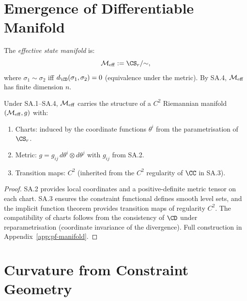 \section{Emergence of Differentiable Manifold}
\label{sec:ch14:manifold}

\begin{definition}\label{def:14.3}
The \emph{effective state manifold} is:
\begin{equation}\label{eq:eff-manifold}
  \CM_{\mathrm{eff}} := \CS_r / {\sim},
\end{equation}
where $\sigma_1 \sim \sigma_2$ iff $d_{\CD}(\sigma_1, \sigma_2) = 0$
(equivalence under the metric).
By SA.4, $\mathcal{M}_{\mathrm{eff}}$ has finite dimension $n$.
\end{definition}

\begin{theorem}\label{thm:14.3}
Under SA.1--SA.4, $\mathcal{M}_{\mathrm{eff}}$ carries the structure of a
$C^2$ Riemannian manifold $(\mathcal{M}_{\mathrm{eff}}, g)$ with:
\begin{enumerate}
  \item Charts: induced by the coordinate functions $\theta^i$ from
        the parametrisation of $\CS_r$.
  \item Metric: $g = g_{ij}\,d\theta^i \otimes d\theta^j$ with
        $g_{ij}$ from SA.2.
  \item Transition maps: $C^2$ (inherited from the $C^2$ regularity
        of $\CC$ in SA.3).
\end{enumerate}
\end{theorem}

\begin{proof}
SA.2 provides local coordinates and a positive-definite metric tensor
on each chart.  SA.3 ensures the constraint functional defines smooth
level sets, and the implicit function theorem provides transition maps
of regularity $C^2$.  The compatibility of charts follows from the
consistency of $\CD$ under reparametrisation (coordinate invariance of
the divergence).  Full construction in Appendix~\ref{app:pf-manifold}.
\end{proof}

\section{Curvature from Constraint Geometry}
\label{sec:ch14:curvature}

